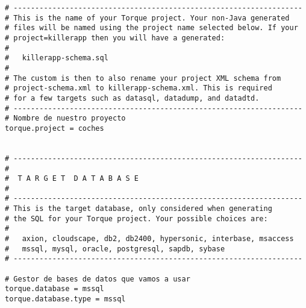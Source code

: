 \begin{lstlisting}
# -------------------------------------------------------------------
# This is the name of your Torque project. Your non-Java generated
# files will be named using the project name selected below. If your
# project=killerapp then you will have a generated:
#
#   killerapp-schema.sql
#
# The custom is then to also rename your project XML schema from
# project-schema.xml to killerapp-schema.xml. This is required
# for a few targets such as datasql, datadump, and datadtd.
# -------------------------------------------------------------------
# Nombre de nuestro proyecto
torque.project = coches


# -------------------------------------------------------------------
#
#  T A R G E T  D A T A B A S E
#
# -------------------------------------------------------------------
# This is the target database, only considered when generating
# the SQL for your Torque project. Your possible choices are:
#
#   axion, cloudscape, db2, db2400, hypersonic, interbase, msaccess
#   mssql, mysql, oracle, postgresql, sapdb, sybase
# -------------------------------------------------------------------

# Gestor de bases de datos que vamos a usar
torque.database = mssql
torque.database.type = mssql



\end{lstlisting}
